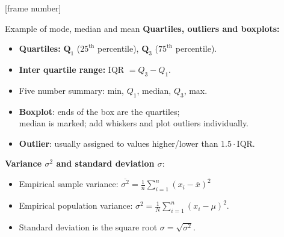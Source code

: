\documentclass[aspectratio=169,t]{beamer}
\begin{document}
  {
    [frame number]
    \begin{frame}{Example of mode, median and mean}
    \textbf{Quartiles, outliers and boxplots:}
    \begin{itemize}
      \item \textbf{Quartiles:} {\color{blue}$\mathbf{Q}_1$} ($25^{\text{th}}$ percentile), {\color{blue}$\mathbf{Q}_3$} ($75^{\text{th}}$ percentile).
      \item \textbf{Inter quartile range:} {\color{blue}IQR} $=Q_3-Q_1$.
      \item Five number summary: min, $Q_1$, median, $Q_3$, max.
      \item \textbf{Boxplot}: ends of the box are the quartiles; \\ median is marked; add whiskers and plot outliers individually.
      \item \textbf{Outlier}: usually assigned to values higher/lower than $1.5 \cdot \text{IQR}$.
    \end{itemize}
    \textbf{Variance $\sigma^2$ and standard deviation $\sigma$}:
    \begin{itemize}
      \item Empirical sample variance: $\overline{\sigma^2} = \frac{1}{n} \sum_{i=1}^{n}(x_i-\overline{x})^2$
      \item Empirical population variance: $\sigma^2 = \frac{1}{N} \sum_{i=1}^{n} (x_i - \mu)^2$.
      \item Standard deviation is the square root $\sigma = \sqrt{\sigma^2}$.
    \end{itemize}
    \end{frame}
  }
\end{document}
